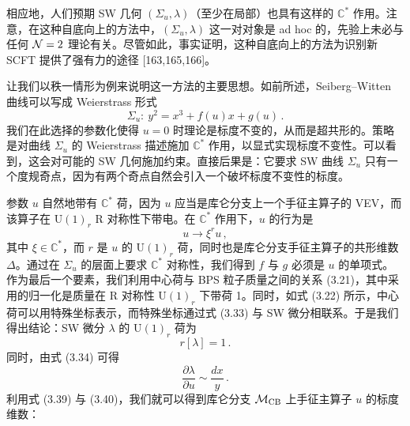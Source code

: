 相应地，人们预期 SW 几何 $(\Sigma_u,\lambda)$（至少在局部）也具有这样的 $\mathbb{C}^*$ 作用。注意，在这种自底向上的方法中，$(\Sigma_u,\lambda)$ 这一对对象是 ad hoc 的，先验上未必与任何 $\mathcal{N}=2$ 理论有关。尽管如此，事实证明，这种自底向上的方法为识别新 SCFT 提供了强有力的途径 [163,165,166]。

让我们以秩一情形为例来说明这一方法的主要思想。如前所述，Seiberg--Witten 曲线可以写成 Weierstrass 形式
\begin{equation}
  \Sigma_u:\ y^2 = x^3 + f(u)x + g(u)\,.
  \tag{3.37}
\end{equation}
我们在此选择的参数化使得 $u=0$ 时理论是标度不变的，从而是超共形的。策略是对曲线 $\Sigma_u$ 的 Weierstrass 描述施加 $\mathbb{C}^*$ 作用，以显式实现标度不变性。可以看到，这会对可能的 SW 几何施加约束。直接后果是：它要求 SW 曲线 $\Sigma_u$ 只有一个度规奇点，因为有两个奇点自然会引入一个破坏标度不变性的标度。


参数 $u$ 自然地带有 $\mathbb{C}^*$ 荷，因为 $u$ 应当是库仑分支上一个手征主算子的 VEV，而该算子在 $\mathrm{U}(1)_r$ R 对称性下带电。在 $\mathbb{C}^*$ 作用下，$u$ 的行为是
\begin{equation}
  u \to \xi^r u\,,
  \tag{3.38}
\end{equation}
其中 $\xi\in\mathbb{C}^*$，而 $r$ 是 $u$ 的 $\mathrm{U}(1)_r$ 荷，同时也是库仑分支手征主算子的共形维数 $\Delta$。通过在 $\Sigma_u$ 的层面上要求 $\mathbb{C}^*$ 对称性，我们得到 $f$ 与 $g$ 必须是 $u$ 的单项式。作为最后一个要素，我们利用中心荷与 BPS 粒子质量之间的关系 (3.21)，其中采用的归一化是质量在 R 对称性 $\mathrm{U}(1)_r$ 下带荷 1。同时，如式 (3.22) 所示，中心荷可以用特殊坐标表示，而特殊坐标通过式 (3.33) 与 SW 微分相联系。于是我们得出结论：SW 微分 $\lambda$ 的 $\mathrm{U}(1)_r$ 荷为
\begin{equation}
  r[\lambda] = 1\,.
  \tag{3.39}
\end{equation}
同时，由式 (3.34) 可得
\begin{equation}
  \frac{\partial \lambda}{\partial u} \sim \frac{dx}{y}\,.
  \tag{3.40}
\end{equation}
利用式 (3.39) 与 (3.40)，我们就可以得到库仑分支 $\mathcal{M}_{\mathrm{CB}}$ 上手征主算子 $u$ 的标度维数：


